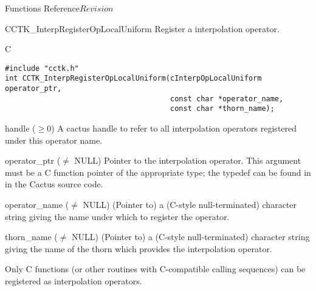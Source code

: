 \begin{cactuspart}{ Functions Reference}{}{$Revision$}


\begin{FunctionDescription}{CCTK\_InterpRegisterOpLocalUniform}
\label{CCTK-InterpRegisterOpLocalUniform}
Register a  interpolation operator.

\begin{SynopsisSection}
\begin{Synopsis}{C}
\begin{verbatim}
#include "cctk.h"
int CCTK_InterpRegisterOpLocalUniform(cInterpOpLocalUniform operator_ptr,
                                      const char *operator_name,
                                      const char *thorn_name);
\end{verbatim}
\end{Synopsis}
\end{SynopsisSection}

\begin{ResultSection}
\begin{Result}{handle ($\ge 0$)}
A cactus handle to refer to all interpolation operators registered
under this operator name.
\end{Result}
\end{ResultSection}

\begin{ParameterSection}
\begin{Parameter}{operator\_ptr ($\ne$ NULL)}
\mbox{}
Pointer to the  interpolation operator.
This argument must be a C function pointer of the appropriate type;
the typedef can be found in  in the
Cactus source code.
\end{Parameter}
\begin{Parameter}{operator\_name ($\ne$ NULL)}
\mbox{}
(Pointer to) a (C-style null-terminated) character string giving
the name under which to register the operator.
\end{Parameter}
\begin{Parameter}{thorn\_name ($\ne$ NULL)}
\mbox{}
(Pointer to) a (C-style null-terminated) character string giving
the name of the thorn which provides the interpolation operator.
\end{Parameter}
\end{ParameterSection}

\begin{Discussion}
Only C functions (or other routines with C-compatible calling sequences)
can be registered as interpolation operators.
\end{Discussion}


\end{FunctionDescription}
\end{cactuspart}
